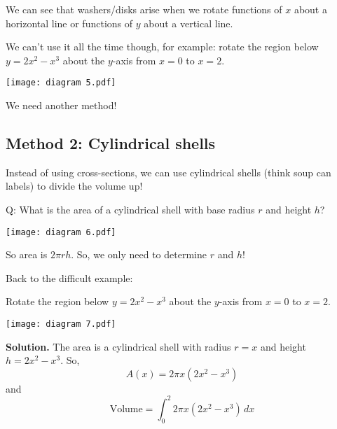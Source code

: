 We can see that washers/disks arise when we rotate functions of $ x $ about
a horizontal line or functions of $ y $ about a vertical line.

We can't use it all the time though, for example: rotate the region below
$ y=2x^2-x^3 $ about the $ y $-axis from $ x=0 $ to $ x=2 $.

\begin{center}
    \texttt{[image: diagram 5.pdf]}
\end{center}

We need another method!

\subsection*{Method 2: Cylindrical shells}

Instead of using cross-sections, we can use cylindrical shells (think soup can labels)
to divide the volume up!

Q\@: What is the area of a cylindrical shell with base radius $ r $ and height $ h $?

\begin{center}
    \texttt{[image: diagram 6.pdf]}
\end{center}

So area is $ 2\pi rh $. So, we only need to determine $ r $ and $ h $!

Back to the difficult example:
\begin{Example}{}{}
    Rotate the region below $ y=2x^2-x^3 $ about the $ y $-axis from $ x=0 $ to $ x=2 $.
    \begin{center}
        \texttt{[image: diagram 7.pdf]}
    \end{center}
    \textbf{Solution.} The area is a cylindrical shell with radius $ r=x $ and height
    $ h=2x^2-x^3 $. So,
    \[ A(x)=2\pi x\left( 2x^2-x^3 \right) \]
    and
    \[ \text{Volume}=\int_{0}^{2}2\pi x\left( 2x^2-x^3 \right)\, d{x} \]
\end{Example}

